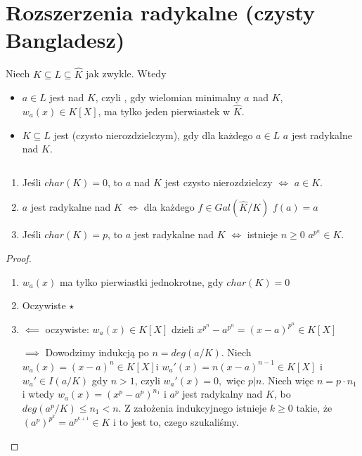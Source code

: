 \section{Rozszerzenia radykalne (czysty Bangladesz)}

\begin{bbox}
    Niech $K\subseteq L\subseteq \hat{K}$ jak zwykle. Wtedy
    \begin{itemize}
        \item[\PHtunny] $a\in L$ jest  nad $K$, czyli , gdy wielomian minimalny $a$ nad $K$, $w_a(x)\in K[X]$, ma tylko jeden pierwiastek w $\hat{K}$.
        \item[\PHtunny] $K\subseteq L$ jest  (czysto nierozdzielczym), gdy dla każdego $a\in L$ $a$ jest radykalne nad $K$.
    \end{itemize}
\end{bbox}

\begin{remark}
    $ $\newline
    \begin{enumerate}
    \item Jeśli $char(K)=0$, to $a$ nad $K$ jest czysto nierozdzielczy $\iff$ $a\in K$.
    \item $a$ jest radykalne nad $K$ $\iff$ dla każdego $f\in Gal(\hat{K}/K)$ $f(a)=a$
    \item Jeśli $char(K)=p$, to $a$ jest radykalne nad $K$ $\iff$ istnieje $n\geq 0$ $a^{p^n}\in K$.
    \end{enumerate}
\end{remark}
\begin{proof}
$ $\newline
\begin{enumerate}[leftmargin=*]
    \item $w_a(x)$ ma tylko pierwiastki jednokrotne, gdy $char(K)=0$
    \item Oczywiste $\star$
    \item $\impliedby$ oczywiste: $w_a(x)\in K[X]$ dzieli $x^{p^n}-a^{p^n}=(x-a)^{p^n}\in K[X]$

    $\implies$ Dowodzimy indukcją po $n=deg(a/K)$. Niech $w_a(x)=(x-a)^n\in K[X]$i $w_a'(x)=n(x-a)^{n-1}\in K[X]$ i $w_a'\in I(a/K)$ gdy $n>1$, czyli $w_a'(x)=0,$ więc $p|n$. Niech więc $n=p\cdot n_1$ i wtedy $w_a(x)=(x^p-a^p)^{n_1}$ i $a^p$ jest radykalny nad $K$, bo $deg(a^p/K)\leq n_1<n$. Z założenia indukcyjnego istnieje $k\geq 0$ takie, że $(a^p)^{p^k}=a^{p^{k+1}}\in K$ i to jest to, czego szukaliśmy. 
\end{enumerate}
\end{proof}


